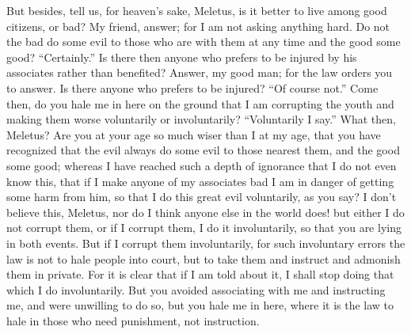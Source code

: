 But besides, tell us, for heaven's sake, Meletus, is it better to live among good citizens, or bad? My friend, answer; for I am not asking anything hard. Do not the bad do some evil to those who are with them at any time and the good some good? “Certainly.” Is there then anyone who  prefers to be injured by his associates rather than benefited? Answer, my good man; for the law orders you to answer. Is there anyone who prefers to be injured? “Of course not.” Come then, do you hale me in here on the ground that I am corrupting the youth and making them worse voluntarily or involuntarily? “Voluntarily I say.” What then, Meletus? Are you at your age so much wiser than I at my age, that you have recognized that the evil always do some evil  to those nearest them, and the good some good; whereas I have reached such a depth of ignorance that I do not even know this, that if I make anyone of my associates bad I am in danger of getting some harm from him, so that I do this great evil voluntarily, as you say? I don't believe this, Meletus, nor do I think anyone else in the world does!  but either I do not corrupt them, or if I corrupt them, I do it involuntarily, so that you are lying in both events. But if I corrupt them involuntarily, for such involuntary errors the law is not to hale people into court, but to take them and instruct and admonish them in private. For it is clear that if I am told about it, I shall stop doing that which I do involuntarily. But you avoided associating with me and instructing me, and were unwilling to do so, but you hale me in here, where it is the law to hale in those who need punishment, not instruction.

